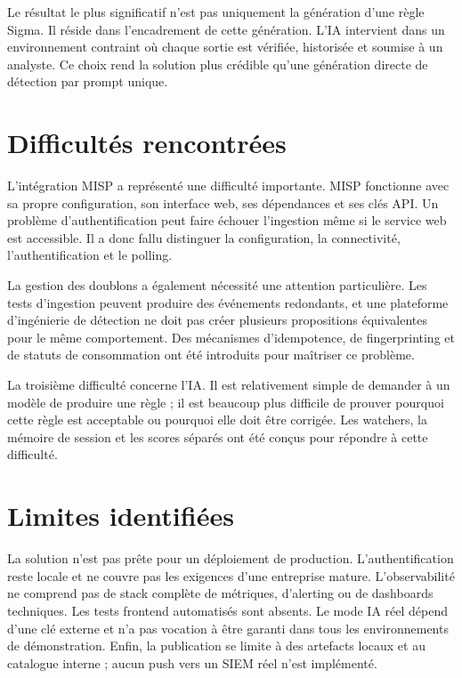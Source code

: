 Le résultat le plus significatif n'est pas uniquement la génération d'une règle Sigma. Il réside dans l'encadrement de cette génération. L'IA intervient dans un environnement contraint où chaque sortie est vérifiée, historisée et soumise à un analyste. Ce choix rend la solution plus crédible qu'une génération directe de détection par prompt unique.

\section{Difficultés rencontrées}

L'intégration MISP a représenté une difficulté importante. MISP fonctionne avec sa propre configuration, son interface web, ses dépendances et ses clés API. Un problème d'authentification peut faire échouer l'ingestion même si le service web est accessible. Il a donc fallu distinguer la configuration, la connectivité, l'authentification et le polling.

La gestion des doublons a également nécessité une attention particulière. Les tests d'ingestion peuvent produire des événements redondants, et une plateforme d'ingénierie de détection ne doit pas créer plusieurs propositions équivalentes pour le même comportement. Des mécanismes d'idempotence, de fingerprinting et de statuts de consommation ont été introduits pour maîtriser ce problème.

La troisième difficulté concerne l'IA. Il est relativement simple de demander à un modèle de produire une règle ; il est beaucoup plus difficile de prouver pourquoi cette règle est acceptable ou pourquoi elle doit être corrigée. Les watchers, la mémoire de session et les scores séparés ont été conçus pour répondre à cette difficulté.

\section{Limites identifiées}

La solution n'est pas prête pour un déploiement de production. L'authentification reste locale et ne couvre pas les exigences d'une entreprise mature. L'observabilité ne comprend pas de stack complète de métriques, d'alerting ou de dashboards techniques. Les tests frontend automatisés sont absents. Le mode IA réel dépend d'une clé externe et n'a pas vocation à être garanti dans tous les environnements de démonstration. Enfin, la publication se limite à des artefacts locaux et au catalogue interne ; aucun push vers un SIEM réel n'est implémenté.

